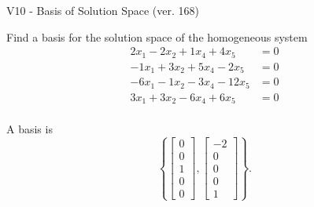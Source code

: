 \begin{exercise}
  \begin{exerciseTitle}V10 - Basis of Solution Space (ver. 168)\end{exerciseTitle}
  \begin{exerciseStatement}
    Find a basis for the solution space of the homogeneous system 
\begin{align*}
 2 x_ 1 -2 x_ 2 + 1 x_ 4 + 4 x_ 5 &= 0  \\ 
  -1 x_ 1 + 3 x_ 2 + 5 x_ 4 -2 x_ 5 &= 0  \\ 
  -6 x_ 1 -1 x_ 2 -3 x_ 4 -12 x_ 5 &= 0  \\ 
  3 x_ 1 + 3 x_ 2 -6 x_ 4 + 6 x_ 5 &= 0  \\ 
 \end{align*}


 
  \end{exerciseStatement}

  \begin{exerciseAnswer}
   A basis is   
\[\left\{\left[\begin{array}{c}
0 \\
0 \\
1 \\
0 \\
0
\end{array}\right] , \left[\begin{array}{c}
-2 \\
0 \\
0 \\
0 \\
1
\end{array}\right]\right\}.\]

  


  \end{exerciseAnswer}
\end{exercise}
